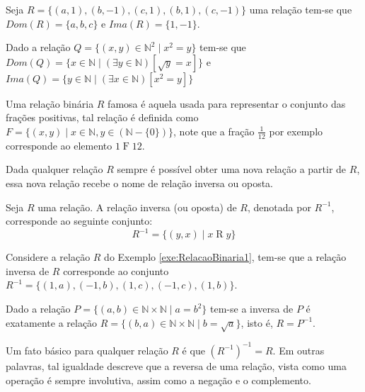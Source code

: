 \begin{exemplo}\label{exe:RelacaoBinaria1}
	Seja $R = \{(a, 1), (b, -1), (c, 1), (b, 1), (c, -1)\}$ uma relação tem-se que $Dom(R) = \{a, b, c\}$ e $Ima(R) = \{1, -1\}$.
\end{exemplo}

\begin{exemplo}
	Dado a relação $Q = \{(x, y) \in \mathbb{N}^2 \mid x^2 = y\}$ tem-se que $Dom(Q) = \{x \in \mathbb{N} \mid (\exists y \in \mathbb{N})[\sqrt{y} = x]\}$ e $Ima(Q) = \{y \in \mathbb{N} \mid (\exists x \in \mathbb{N})[x^2 = y]\}$
\end{exemplo}

\begin{exemplo}
	Uma relação binária $R$ famosa é aquela usada para representar o conjunto das frações positivas, tal relação é definida como $F = \{(x, y)\mid x \in \mathbb{N}, y \in (\mathbb{N}-\{0\})\}$, note que a fração $\displaystyle\frac{1}{12}$ por exemplo corresponde ao elemento $1\mathrel{F}12$.
\end{exemplo}

Dada qualquer relação $R$ sempre é possível obter uma nova relação a partir de $R$, essa nova relação recebe o nome de relação inversa ou oposta.

\begin{definicao}\label{def:RelacaoInversa}
	Seja $R$ uma relação. A relação inversa (ou oposta) de $R$, denotada por $R^{-1}$, corresponde ao seguinte conjunto:
	$$R^{-1} = \{(y,x) \mid x\mathrel{R}y\}$$
\end{definicao}

\begin{exemplo}
  Considere a relação $R$ do Exemplo \ref{exe:RelacaoBinaria1}, tem-se que a relação inversa de $R$ corresponde ao conjunto $R^{-1} = \{(1, a), (-1, b), (1, c), (-1, c), (1, b)\}$.
\end{exemplo}

\begin{exemplo}
  Dado a relação $P = \{(a, b) \in \mathbb{N} \times \mathbb{N} \mid a = b^2\}$ tem-se a inversa de $P$ é exatamente a relação $R = \{(b, a) \in \mathbb{N} \times \mathbb{N} \mid b = \sqrt{a}\}$, isto é, $R = P^{-1}$.
\end{exemplo}

Um fato básico para qualquer relação $R$ é que $(R^{-1})^{-1} = R$. Em outras palavras, tal igualdade descreve que a reversa de uma relação, vista como uma operação é sempre involutiva, assim como a negação e o complemento.

